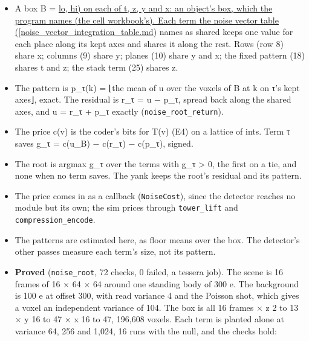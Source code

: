 \begin{itemize}
\item A box B = \hyperref[chap:noise-vector-integration-table]{lo, hi) on each of t, z, y and x: an object's box, which the program names (the cell workbook's). Each term the noise vector table ([noise\_\allowbreak{}vector\_\allowbreak{}integration\_\allowbreak{}table.md}) names as shared keeps one value for each place along its kept axes and shares it along the rest. Rows (row 8) share x; columns (9) share y; planes (10) share y and x; the fixed pattern (18) shares t and z; the stack term (25) shares z.
\item The pattern is p\_\allowbreak{}τ(k) = ⌊the mean of u over the voxels of B at k on τ's kept axes⌋, exact. The residual is r\_\allowbreak{}τ = u − p\_\allowbreak{}τ, spread back along the shared axes, and u = r\_\allowbreak{}τ + p\_\allowbreak{}τ exactly (\texttt{noise\_\allowbreak{}root\_\allowbreak{}return}).
\item The price c(v) is the coder's bits for T(v) (E4) on a lattice of ints. Term τ saves g\_\allowbreak{}τ = c(u\_\allowbreak{}B) − c(r\_\allowbreak{}τ) − c(p\_\allowbreak{}τ), signed.
\item The root is argmax g\_\allowbreak{}τ over the terms with g\_\allowbreak{}τ > 0, the first on a tie, and none when no term saves. The yank keeps the root's residual and its pattern.
\item The price comes in as a callback (\texttt{Noise\allowbreak{}Cost}), since the detector reaches no module but its own; the sim prices through \texttt{tower\_\allowbreak{}lift} and \texttt{compression\_\allowbreak{}encode}.
\item The patterns are estimated here, as floor means over the box. The detector's other passes measure each term's size, not its pattern.
\item \textbf{Proved} (\texttt{noise\_\allowbreak{}root}, 72 checks, 0 failed, a tessera job). The scene is 16 frames of 16 × 64 × 64 around one standing body of 300 e. The background is 100 e at offset 300, with read variance 4 and the Poisson shot, which gives a voxel an independent variance of 104. The box is all 16 frames × z 2 to 13 × y 16 to 47 × x 16 to 47, 196,608 voxels. Each term is planted alone at variance 64, 256 and 1,024, 16 runs with the null, and the checks hold:


\end{itemize}
